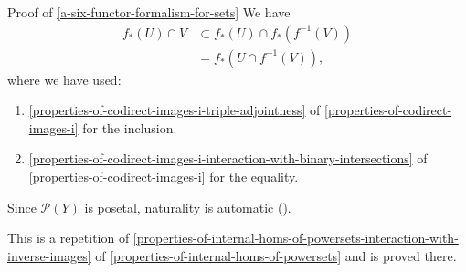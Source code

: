 \begin{Proof}{Proof of \cref{a-six-functor-formalism-for-sets}}
    We have
    \begin{align*}
        f_{*}(U)\cap V &\subset f_{*}(U)\cap f_{*}(f^{-1}(V))\\
                       &=       f_{*}(U\cap f^{-1}(V)),
    \end{align*}
    where we have used:
    \begin{enumerate}
        \item\label{proof-of-a-six-functor-formalism-for-sets-the-projection-formula-2-1}\cref{properties-of-codirect-images-i-triple-adjointness} of \cref{properties-of-codirect-images-i} for the inclusion.
        \item\label{proof-of-a-six-functor-formalism-for-sets-the-projection-formula-2-2}\cref{properties-of-codirect-images-i-interaction-with-binary-intersections} of \cref{properties-of-codirect-images-i} for the equality.
    \end{enumerate}
    Since $\mathcal{P}(Y)$ is posetal, naturality is automatic ().

    This is a repetition of \cref{properties-of-internal-homs-of-powersets-interaction-with-inverse-images} of \cref{properties-of-internal-homs-of-powersets} and is proved there.


\end{Proof}
